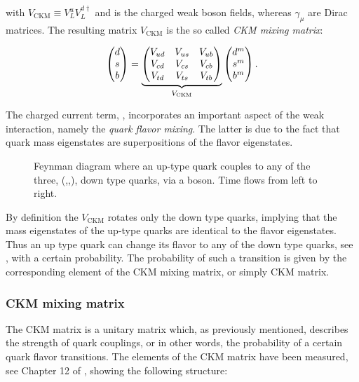 \noindent with $V_{\text{CKM}} \equiv V^u_LV^{d\dagger}_L$ and \Wpm is the charged weak boson fields, whereas $\gamma_\mu$ are Dirac matrices.
The resulting matrix $V_{\text{CKM}}$ is the so called {\it CKM mixing matrix}:

\begin{equation}
  \centering
  \begin{pmatrix} \dquark \\ \squark \\ \bquark  \end{pmatrix} =
  \underbrace{\begin{pmatrix} \Vud & \Vus & \Vub \\ \Vcd & \Vcs & \Vcb \\ \Vtd & \Vts & \Vtb \end{pmatrix}}_{V_{\text{CKM}}}
    \begin{pmatrix} \dquark^m \\ \squark^m \\ \bquark^m  \end{pmatrix}.
      \label{quark_field_rotation}
  \end{equation}

The charged current term, , incorporates an important aspect of the weak interaction,
namely the {\it quark flavor mixing}. The latter is due to the fact that quark mass eigenstates are superpositions
of the flavor eigenstates.

\begin{figure}[h!]
  \centering
  {\sffamily }
  \caption{Feynman diagram where an up-type quark couples to any of the three, (\dquark,\squark,\bquark), down type quarks,
           via a \Wp boson. Time flows from left to right.}
  \label{QuarkMixing}
\end{figure}

\noindent By definition the $V_{\text{CKM}}$ rotates only the down type quarks, implying that
the mass eigenstates of the up-type quarks are identical to the flavor eigenstates. Thus an up type quark
can change its flavor to any of the down type quarks, see , with a certain probability.
The probability of such a transition is given by the corresponding element of the CKM mixing matrix, or simply CKM matrix.

\subsubsection{CKM mixing matrix}
The CKM matrix is a unitary matrix which, as previously mentioned, describes the strength of quark couplings, or in other words,
the probability of a certain quark flavor transitions. The elements of the CKM matrix have been measured,
see \eg Chapter 12 of \cite{PDG}, showing the following structure:

